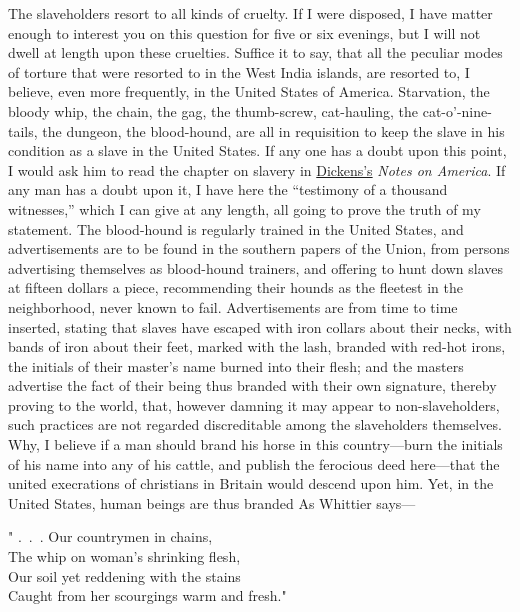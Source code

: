 The slaveholders resort to all kinds of cruelty. If I were disposed, I
have matter enough to interest you on this question for {}five or six
evenings, but I will not dwell at length upon these cruelties. Suffice
it to say, that all the peculiar modes of torture that were resorted to
in the West India islands, are resorted to, I believe, even more
frequently, in the United States of America. Starvation, the bloody
whip, the chain, the gag, the thumb-screw, cat-hauling, the
cat-o'-nine-tails, the dungeon, the blood-hound, are all in requisition
to keep the slave in his condition as a slave in the United States. If
any one has a doubt upon this point, I would ask him to read the chapter
on slavery in \href{/wiki/Author:Charles_Dickens}{Dickens's} \emph{Notes
on America}. If any man has a doubt upon it, I have here the ``testimony
of a thousand witnesses,'' which I can give at any length, all going to
prove the truth of my statement. The blood-hound is regularly trained in
the United States, and advertisements are to be found in the southern
papers of the Union, from persons advertising themselves as blood-hound
trainers, and offering to hunt down slaves at fifteen dollars a piece,
recommending their hounds as the fleetest in the neighborhood, never
known to fail. Advertisements are from time to time inserted, stating
that slaves have escaped with iron collars about their necks, with bands
of iron about their feet, marked with the lash, branded with red-hot
irons, the initials of their master's name burned into their flesh; and
the masters advertise the fact of their being thus branded with their
own signature, thereby proving to the world, that, however damning it
may appear to non-slaveholders, such practices are not regarded
discreditable among the slaveholders themselves. Why, I believe if a man
should brand his horse in this country---burn the initials of his name
into any of his cattle, and publish the ferocious deed here---that the
united execrations of christians in Britain would descend upon him. Yet,
in the United States, human beings are thus branded As Whittier says---

{"} {.~.~.} Our countrymen in chains,\\
{﻿}The whip on woman's shrinking flesh,\\
Our soil yet reddening with the stains\\
{﻿}Caught from her scourgings warm and fresh."

